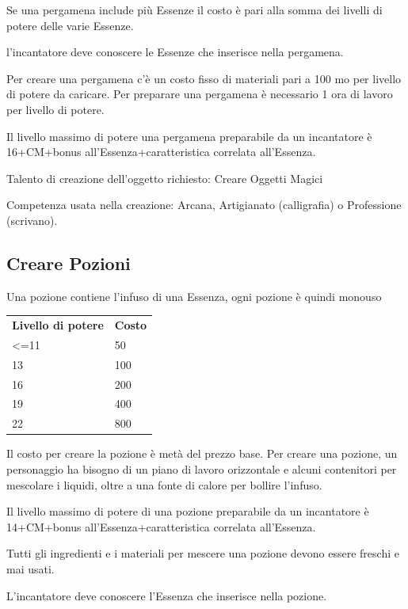 \documentclass[a4paper,11pt,twoside,openany]{book}
\begin{document}
\bigskip

Se una pergamena include più Essenze il costo è pari alla somma dei livelli di potere delle varie Essenze.

l'incantatore deve conoscere le Essenze che inserisce nella pergamena.

Per creare una pergamena c'è un costo fisso di materiali pari a 100 mo per livello di potere da caricare. Per preparare una pergamena è necessario 1 ora di lavoro per livello di potere.

Il livello massimo di potere una pergamena preparabile da un incantatore è 16+CM+bonus all'Essenza+caratteristica correlata all'Essenza.

Talento di creazione dell'oggetto richiesto: Creare Oggetti Magici

Competenza usata nella creazione: Arcana, Artigianato (calligrafia) o Professione (scrivano).

\subsection{Creare Pozioni}

Una pozione contiene l'infuso di una Essenza, ogni pozione è quindi monouso

\bigskip

\begin{tabular}{ll}
	\toprule
	\textbf{Livello di potere} & \textbf{Costo}\tabularnewline
	\textless=11               & 50\tabularnewline
	13                         & 100\tabularnewline
	16                         & 200\tabularnewline
	19                         & 400\tabularnewline
	22                         & 800\tabularnewline
\end{tabular}

\bigskip

Il costo per creare la pozione è metà del prezzo base. Per creare una pozione, un personaggio ha bisogno di un piano di lavoro orizzontale e alcuni contenitori per mescolare i liquidi, oltre a una fonte di calore per bollire l'infuso.

Il livello massimo di potere di una pozione preparabile da un incantatore è 14+CM+bonus all'Essenza+caratteristica correlata all'Essenza.

Tutti gli ingredienti e i materiali per mescere una pozione devono essere freschi e mai usati.

L'incantatore deve conoscere l'Essenza che inserisce nella pozione.
\end{document}
